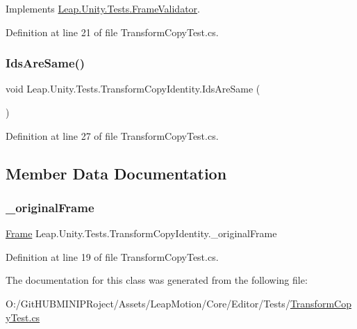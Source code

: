 Implements \mbox{\hyperlink{class_leap_1_1_unity_1_1_tests_1_1_frame_validator_ae397067480c6fd2183160f048094e466}{Leap.\+Unity.\+Tests.\+Frame\+Validator}}.



Definition at line 21 of file Transform\+Copy\+Test.\+cs.

\mbox{\label{class_leap_1_1_unity_1_1_tests_1_1_transform_copy_identity_a62950c0fc6bd366858f269534f082c75}} 
\subsubsection{\texorpdfstring{IdsAreSame()}{IdsAreSame()}}
{\footnotesize\ttfamily void Leap.\+Unity.\+Tests.\+Transform\+Copy\+Identity.\+Ids\+Are\+Same (\begin{DoxyParamCaption}{ }\end{DoxyParamCaption})}



Definition at line 27 of file Transform\+Copy\+Test.\+cs.



\subsection{Member Data Documentation}
\mbox{\label{class_leap_1_1_unity_1_1_tests_1_1_transform_copy_identity_adf6db3ba0e146733605aa800eaba363f}} 
\subsubsection{\texorpdfstring{\_originalFrame}{\_originalFrame}}
{\footnotesize\ttfamily \mbox{\hyperlink{class_leap_1_1_frame}{Frame}} Leap.\+Unity.\+Tests.\+Transform\+Copy\+Identity.\+\_\+original\+Frame\hspace{0.3cm}{\ttfamily [protected]}}



Definition at line 19 of file Transform\+Copy\+Test.\+cs.



The documentation for this class was generated from the following file\+:\begin{DoxyCompactItemize}
\item 
O\+:/\+Git\+H\+U\+B\+M\+I\+N\+I\+P\+Roject/\+Assets/\+Leap\+Motion/\+Core/\+Editor/\+Tests/\mbox{\hyperlink{_transform_copy_test_8cs}{Transform\+Copy\+Test.\+cs}}\end{DoxyCompactItemize}

